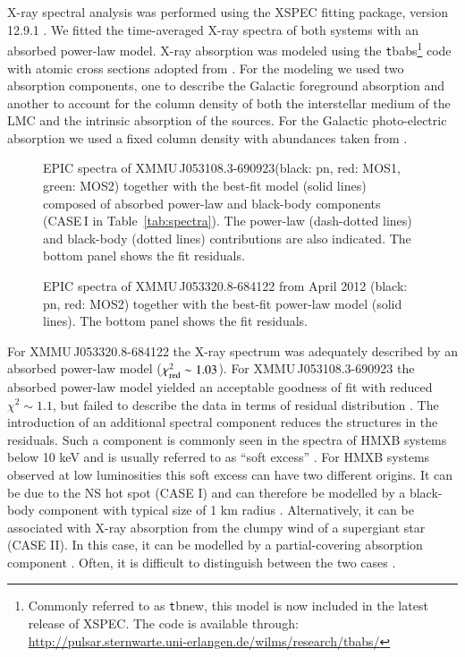 \documentclass[a4paper,fleqn,usenatbib]{mnras}
\newcommand{\canda}{XMMU\,J053108.3-690923\xspace} %
\newcommand{\candb}{XMMU\,J053320.8-684122\xspace} %
\begin{document}
X-ray spectral analysis was performed using the {\small XSPEC} fitting package, version 12.9.1 \citep{1996ASPC..101...17A}. 
We fitted the time-averaged X-ray spectra of both systems with an absorbed power-law model. 
X-ray absorption was modeled using the {\texttt tbabs}\footnote{Commonly referred to as {\texttt tbnew}, this model is now included in the latest release of {\small XSPEC}. The code is available through: \url{http://pulsar.sternwarte.uni-erlangen.de/wilms/research/tbabs/}} code \citep{2000ApJ...542..914W} with atomic cross sections adopted from \cite{1996ApJ...465..487V}.
For the modeling we used two absorption components, one to describe the Galactic foreground absorption and another to account for the column density of both the interstellar medium of the LMC and the intrinsic absorption of the sources.
For the Galactic photo-electric absorption we used a fixed column density \citep{1990ARA&A..28..215D} with abundances taken from \cite{2000ApJ...542..914W}.

\begin{figure}
  \caption{EPIC spectra of \canda (black: pn, red: MOS1, green: MOS2) together with the best-fit model (solid lines) composed of 
           absorbed power-law and black-body components (CASE\,I in Table~\ref{tab:spectra}).
           The power-law (dash-dotted lines) and black-body (dotted lines) contributions are also indicated. The bottom panel 
           shows the fit residuals.}   
  \label{fig:spec_a}
\end{figure}


\begin{figure}
  \caption{EPIC spectra of \candb from April 2012 (black: pn, red: MOS2) together with the best-fit power-law model (solid lines). The bottom panel 
           shows the fit residuals.}
  \label{fig:spec_b}
\end{figure}



For \candb the X-ray spectrum was adequately described by an absorbed power-law model ($\chi^2_{\rm red}\sim1.03$). 
For \canda the absorbed power-law model yielded an acceptable goodness of fit with reduced $\chi^2\sim1.1$, but failed to describe the data in terms of residual distribution \citep{2010arXiv1012.3754A}. 
The introduction of an additional spectral component reduces the structures in the residuals. 
Such a component is commonly seen in the spectra of HMXB systems below 10 keV and is usually referred to as ``soft excess'' \citep{2004ApJ...614..881H}.
For HMXB systems observed at low luminosities this soft excess can have two different origins. 
It can be due to the NS hot spot (CASE I) and can therefore be modelled by a black-body component with typical size of 1 km radius \citep{2006A&A...455..283L,2013MNRAS.436.2054B,2013A&A...558A..74V,2017ApJ...838..133S}. 
Alternatively, it can be associated with X-ray absorption from the clumpy wind of a supergiant star (CASE II). In this case, it can be modelled by a partial-covering absorption component \citep{2009ApJ...694..344T}. Often, it is difficult to distinguish between the two cases \citep[e.g.][]{2017ApJ...841...35F}.
\end{document}
